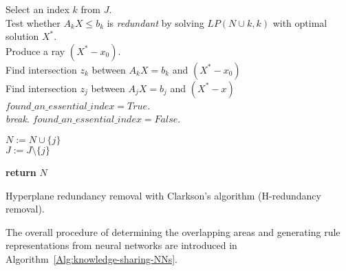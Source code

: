 \documentclass[lettersize,journal]{IEEEtran}
\begin{document}
\begin{algorithm}[!t]
\scriptsize
{}

{
	Select an index $k$ from $J$.\\
	Test whether $A_k X \leq b_k$ is \textit{redundant} by solving $LP(N \cup k,k)$ with optimal solution $X^*$. \\
	{
		Produce a ray $(X^*-x_0)$.\\
		Find intersection $z_k$ between $A_k X = b_k$ and $(X^*-x_0)$\\
		{
		    Find intersection $z_j$ between $A_j X = b_j$ and $(X^*-x)$ \\
		    {
		        $found\_an\_essential\_index = True$.\\
		        \textit{break}.
		    }
		}
	}
	\Else
	{
		$found\_an\_essential\_index = False$.
	}

	{
		$N:= N \cup \{j\}$\\
		$J:= J \setminus \{j\}$
	}
}

\textbf{return} $N$

\caption{Hyperplane redundancy removal with Clarkson’s algorithm (H-redundancy removal).}\label{Alg:redundancy_removal}
\end{algorithm}

The overall procedure of determining the overlapping areas and generating rule representations from neural networks are introduced in Algorithm~\ref{Alg:knowledge-sharing-NNs}.
\end{document}
